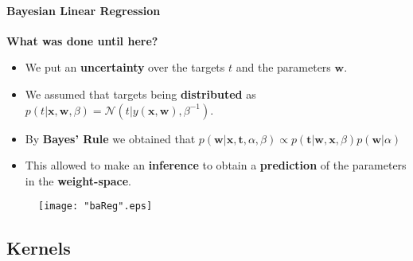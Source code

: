 \begin{frame}{\insertsubsection}
    \framesubtitle{Bayesian Linear Regression} 

    \textcolor{UniGold}{\textbf{What was done until here?}}
    \begin{itemize}
        \item We put an \textcolor{UniOrange}{\textbf{uncertainty}} over the targets $t$ and the parameters $\mathbf{w}$.
        \item We assumed that targets being \textcolor{UniOrange}{\textbf{distributed}} as $p( t| \mathbf{x}, \mathbf{w}, \beta) = \mathcal{N} ( t | y(\mathbf{x}, \mathbf{w}), \beta^{-1})$.
        \item By \textcolor{UniOrange}{\textbf{Bayes' Rule}} we obtained that $p\left( \mathbf{w} | \mathbf{x}, \mathbf{t}, \alpha, \beta \right) \propto p\left(  \mathbf{t} |\mathbf{w} ,\mathbf{x}, \beta \right) p\left( \mathbf{w} | \alpha \right)$
        \item This allowed to make an \textcolor{UniOrange}{\textbf{inference}} to obtain a \textcolor{UniOrange}{\textbf{prediction}} of the parameters in the \textcolor{UniOrange}{\textbf{weight-space}}.
        
    \end{itemize}

    \begin{figure}
		\label{fig:baReg}
        \hspace*{-1.4cm}\texttt{[image: "baReg".eps]}
	\end{figure}
\end{frame}






\subsection{Kernels}
\begin{frame}{\insertsubsection}
    
\end{frame}
